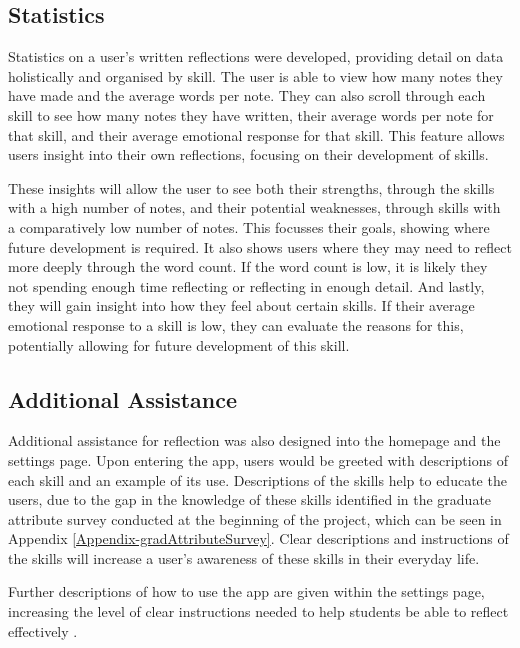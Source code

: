 \documentclass{l4proj}
\begin{document}
\subsection{Statistics}

Statistics on a user's written reflections were developed, providing detail on data holistically and organised by skill. The user is able to view how many notes they have made and the average words per note. They can also scroll through each skill to see how many notes they have written, their average words per note for that skill, and their average emotional response for that skill. This feature allows users insight into their own reflections, focusing on their development of skills.  

These insights will allow the user to see both their strengths, through the skills with a high number of notes, and their potential weaknesses, through skills with a comparatively low number of notes. This focusses their goals, showing where future development is required. It also shows users where they may need to reflect more deeply through the word count. If the word count is low, it is likely they not spending enough time reflecting or reflecting in enough detail. And lastly, they will gain insight into how they feel about certain skills. If their average emotional response to a skill is low, they can evaluate the reasons for this, potentially allowing for future development of this skill.


\subsection{Additional Assistance}

Additional assistance for reflection was also designed into the homepage and the settings page. Upon entering the app, users would be greeted with descriptions of each skill and an example of its use. Descriptions of the skills help to educate the users, due to the gap in the knowledge of these skills identified in the graduate attribute survey conducted at the beginning of the project, which can be seen in Appendix \ref{Appendix-gradAttributeSurvey}. Clear descriptions and instructions of the skills will increase a user’s awareness of these skills in their everyday life.

Further descriptions of how to use the app are given within the settings page, increasing the level of clear instructions needed to help students be able to reflect effectively \citep{bruno_reflective_2018}.
\end{document}
